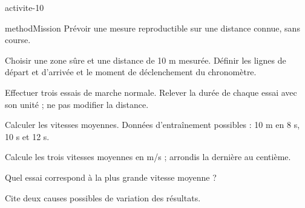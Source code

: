 \documentclass[12pt,twoside,openany]{book}
\begin{document}
\label{ch-10-activite}
\begin{pcFiche}{activite-10}
\begin{pcEncadre}{method}{Mission}
Prévoir une mesure reproductible sur une distance connue, sans course.\par
\end{pcEncadre}
\begin{questions}
\item Choisir une zone sûre et une distance de 10 m mesurée. Définir les lignes de départ et d’arrivée et le moment de déclenchement du chronomètre.
\item Effectuer trois essais de marche normale. Relever la durée de chaque essai avec son unité ; ne pas modifier la distance.
\item Calculer les vitesses moyennes. Données d’entraînement possibles : 10 m en 8 s, 10 s et 12 s.
\end{questions}
\begin{questions}
\item Calcule les trois vitesses moyennes en m/s ; arrondis la dernière au centième.
\item Quel essai correspond à la plus grande vitesse moyenne ?
\item Cite deux causes possibles de variation des résultats.
\end{questions}
\end{pcFiche}
\label{ch-10-bilan}
\end{document}
